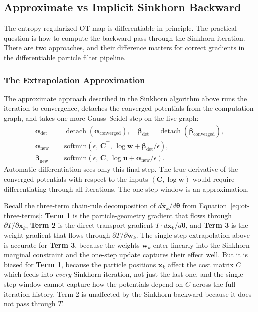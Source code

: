 \documentclass{article}
\renewcommand{\v}[1]{ \ensuremath{ {\mathbf{#1}} }}
\begin{document}
\subsection{Approximate vs Implicit Sinkhorn Backward}
\label{sec:sinkhorn-backward}

The entropy-regularized OT map is differentiable in principle. The practical question is how to compute the backward pass through the Sinkhorn iteration. There are two approaches, and their difference matters for correct gradients in the differentiable particle filter pipeline.

\subsubsection{The Extrapolation Approximation}

The approximate approach described in the Sinkhorn algorithm above runs the iteration to convergence, detaches the converged potentials from the computation graph, and takes one more Gauss--Seidel step on the live graph:
\begin{align}
    \boldsymbol{\alpha}_{\mathrm{det}} &= \operatorname{detach}(\boldsymbol{\alpha}_{\mathrm{converged}}), \quad \boldsymbol{\beta}_{\mathrm{det}} = \operatorname{detach}(\boldsymbol{\beta}_{\mathrm{converged}}), \\
    \boldsymbol{\alpha}_{\mathrm{new}} &= \mathrm{softmin}\!\left(\epsilon,\, \mathbf{C}^\top,\, \log\mathbf{w} + \boldsymbol{\beta}_{\mathrm{det}}/\epsilon\right), \\
    \boldsymbol{\beta}_{\mathrm{new}} &= \mathrm{softmin}\!\left(\epsilon,\, \mathbf{C},\, \log\mathbf{u} + \boldsymbol{\alpha}_{\mathrm{new}}/\epsilon\right).
\end{align}
Automatic differentiation sees only this final step. The true derivative of the converged potentials with respect to the inputs $(\mathbf{C}, \log\mathbf{w})$ would require differentiating through all iterations. The one-step window is an approximation.

Recall the three-term chain-rule decomposition of $d\tilde{\mathbf{x}}_k/d\v\theta$ from Equation~\ref{eq:ot-three-terms}: \textbf{Term 1} is the particle-geometry gradient that flows through $\partial T/\partial \mathbf{x}_k$, \textbf{Term 2} is the direct-transport gradient $T \cdot d\mathbf{x}_k/d\v\theta$, and \textbf{Term 3} is the weight gradient that flows through $\partial T/\partial \mathbf{w}_k$. The single-step extrapolation above is accurate for \textbf{Term 3}, because the weights $\mathbf{w}_k$ enter linearly into the Sinkhorn marginal constraint and the one-step update captures their effect well. But it is biased for \textbf{Term 1}, because the particle positions $\mathbf{x}_k$ affect the cost matrix $C$ which feeds into \emph{every} Sinkhorn iteration, not just the last one, and the single-step window cannot capture how the potentials depend on $C$ across the full iteration history. Term 2 is unaffected by the Sinkhorn backward because it does not pass through $T$.
\end{document}
